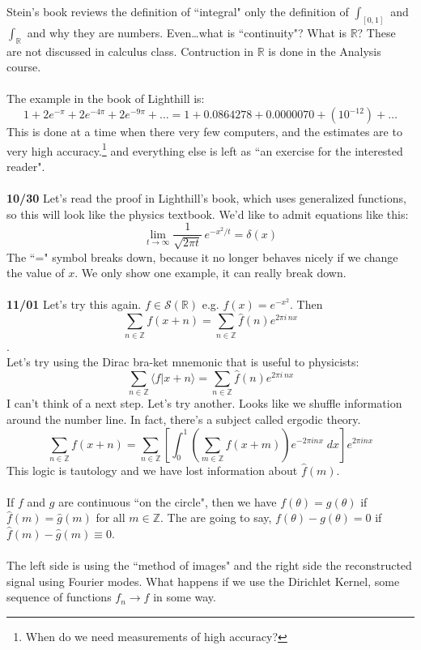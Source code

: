 \documentclass[12pt]{article}
\begin{document}
Stein's book reviews the definition of ``integral" only the definition of $\int_{[0,1]}$ and $\int_\mathbb{R}$ and why they are numbers.  Even\dots what is ``continuity"?  What is $\mathbb{R}$?  These are not discussed in calculus class.  Contruction in $\mathbb{R}$ is done in the Analysis course. \\ \\
The example in the book of Lighthill is:
$$ 1 + 2 e^{-\pi} + 2 e^{-4\pi} + 2 e^{-9\pi} + \dots = 1 + 0.0864278 + 0.0000070 + (10^{-12}) + \dots $$
This is done at a time when there very few computers, and the estimates are to very high accuracy.\footnote{When do we need measurements of high accuracy?} and everything else is left as ``an exercise for the interested reader".   \\ \\ 
\textbf{10/30} Let's read the proof in Lighthill's book, which uses generalized functions, so this will look like the physics textbook.  We'd like to admit equations like this:
$$ \lim_{t \to \infty}  \frac{1}{\sqrt{2\pi t}} \, e^{- x^2 / t} = \delta(x) $$
The ``=" symbol breaks down, because it no longer behaves nicely if we change the value of $x$.  We only show one example, it can really break down. \\ \\
\textbf{11/01} Let's try this again.  $f \in \mathcal{S}(\mathbb{R})$ e.g. $f(x) = e^{-x^2}$.  Then
$$ \sum_{n \in \mathbb{Z}} f(x+n) = \sum_{n \in \mathbb{Z}} \hat{f}(n) e^{2\pi i \, n x} $$
. \\
Let's try using the Dirac bra-ket mnemonic that is useful to physicists:
$$\sum_{n \in \mathbb{Z}} \langle f | x+n \rangle = \sum_{n \in \mathbb{Z}} \hat{f}(n) e^{2\pi i \, n x}  $$
I can't think of a next step.  Let's try another. Looks like we shuffle information around the number line.  In fact, there's a subject called ergodic theory.  
$$ \sum_{n \in \mathbb{Z}} f(x+n) = \sum_{n \in \mathbb{Z}} \left[ \int_0^1 \left( \sum_{m \in \mathbb{Z}} f(x+m)  \right) e^{-2\pi i n x } \; dx \right] e^{2\pi i n x} $$
This logic is tautology and we have lost information about $\hat{f}(m)$. \\ \\
If $f$ and $g$ are continuous ``on the circle", then we have $f(\theta) = g(\theta)$ if $\hat{f}(m) = \hat{g}(m)$ for all $m \in \mathbb{Z}$.  The are going to say, $f(\theta) - g(\theta) = 0$ if $\hat{f}(m) - \hat{g}(m)\equiv 0$. \\ \\
The left side is using the ``method of images" and the right side the reconstructed signal using Fourier modes.  What happens if we use the Dirichlet Kernel, some sequence of functions $f_n \to f$ in some way.
\end{document}
